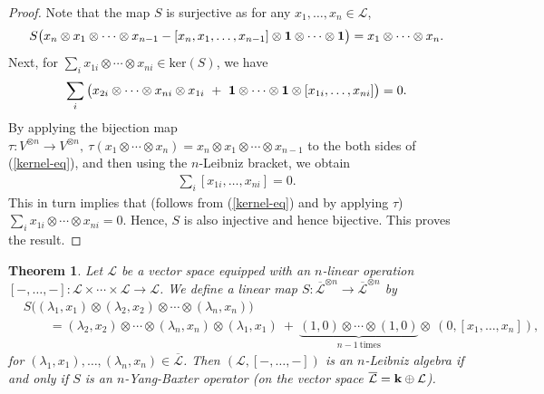 \documentclass[a4paper,reqno,10pt]{amsart}
\theoremstyle{plain}
\newtheorem{thm}{Theorem}[section]
\theoremstyle{definition}
\theoremstyle{remark}
\begin{document}
\begin{proof}
    Note that the map $S$ is surjective as for any $x_1 , \ldots, x_n \in \mathcal{L}$, 
    \begin{align*}
        S \big( x_n \otimes x_1 \otimes \cdots \otimes x_{n-1} - [x_n, x_1, \ldots, x_{n-1}] \otimes {\bf 1} \otimes \cdots \otimes {\bf 1} \big)
        = x_1 \otimes \cdots \otimes x_n.
    \end{align*}
    Next, for $\sum_{i} x_{1i} \otimes \cdots \otimes x_{ni} \in \mathrm{ker}(S)$, we have
    \begin{align}\label{kernel-eq}
        \sum_i \big(  x_{2i} \otimes \cdots \otimes x_{ni} \otimes x_{1i} ~+~ {\bf 1} \otimes \cdots \otimes {\bf 1} \otimes [x_{1i}, \ldots,  x_{ni}]  \big) = 0.
    \end{align}
    By applying the bijection map $\tau : V^{\otimes n} \rightarrow V^{\otimes n}, ~\tau (x_1 \otimes \cdots \otimes x_n) = x_n \otimes x_1 \otimes \cdots \otimes x_{n-1}$ to the both sides of (\ref{kernel-eq}), and then using the $n$-Leibniz bracket, we obtain
    \begin{align*}
         \sum_i [x_{1i} , \ldots, x_{ni}] = 0.
    \end{align*}
    This in turn implies that (follows from (\ref{kernel-eq}) and by applying $\tau$) $\sum_i x_{1i} \otimes \cdots \otimes x_{ni} = 0$. Hence, $S$ is also injective and hence bijective. This proves the result.
\end{proof}

\begin{thm}
    Let $\mathcal{L}$ be a vector space equipped with an $n$-linear operation $[-, \ldots, - ] : \mathcal{L} \times \cdots \times \mathcal{L} \rightarrow \mathcal{L}$. We define a linear map $S : \overline{\mathcal{L}}^{ \otimes n} \rightarrow \overline{\mathcal{L}}^{ \otimes n}$ by 
    \begin{align*}
        &S \big( (\lambda_1, x_1) \otimes (\lambda_2, x_2) \otimes \cdots \otimes (\lambda_n, x_n) \big) \\
        & \qquad = (\lambda_2, x_2) \otimes \cdots \otimes (\lambda_n, x_n) \otimes (\lambda_1, x_1) ~+~ \underbrace{(1, 0) \otimes \cdots \otimes (1, 0)}_{n-1 \mathrm{~times}} \otimes ~ \! (0, [x_1, \ldots, x_n]),
    \end{align*}
    for $(\lambda_1, x_1), \ldots , (\lambda_n, x_n) \in \overline{\mathcal{L}}$.
    Then $(\mathcal{L}, [-, \ldots, -])$ is an $n$-Leibniz algebra if and only if $S$ is an $n$-Yang-Baxter operator (on the vector space $\overline{\mathcal{L}} = {\bf k} \oplus \mathcal{L}$).
\end{thm}
\end{document}
